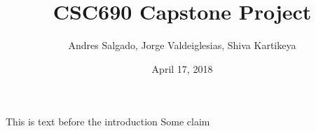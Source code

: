 \documentclass{article}
\title{CSC690 Capstone Project}
\author{Andres Salgado, Jorge Valdeiglesias, Shiva Kartikeya}
\date{April 17, 2018}
\begin{document}
\maketitle
This is text before the introduction
Some claim \cite{vidal_tokenizing_2017}


\end{document}
